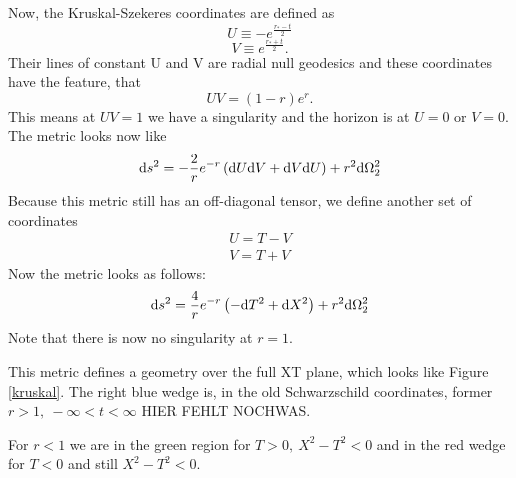 		Now, the Kruskal-Szekeres coordinates are defined as
		\begin{equation}
			U\equiv -e^{\frac{r_*-t}{2}}
		\end{equation}
		\begin{equation}
			V\equiv e^{\frac{r_*+t}{2}}.
		\end{equation}
	Their lines of constant U and V are radial null geodesics and these coordinates have the feature, that
		\begin{equation}
			 UV=(1-r)e^r.
		\end{equation}
	This means at $UV=1$ we have a singularity and the horizon is at $U=0$ or $V=0$. The metric looks now like
		\begin{equation}
			\mathrm{d} s^2=-\frac{2}{r}e^{-r}\left(\mathrm{d} U \mathrm{d} V + \mathrm{d} V \mathrm{d} U\right)+r^2 \mathrm{d} \Omega^2_{2}
		\end{equation}
	Because this metric still has an off-diagonal tensor, we define another set of coordinates
		\begin{equation}
		\begin{split}
			U=T-V 	\\	
			V=T+V
		\end{split}
		\end{equation}
	Now the metric looks as follows:
		\begin{equation}\label{SchXT}
			\mathrm{d} s^2=\frac{4}{r}e^{-r}\left(- \mathrm{d} T^2+ \mathrm{d} X^2\right)+r^2 \mathrm{d} \Omega^2_2
		\end{equation}
	Note that there is now no singularity at $r=1$. 
	
	This metric defines a geometry over the full XT plane, which looks like Figure \ref{kruskal}. The right blue wedge is, in the old Schwarzschild coordinates, former $r>1,~-\infty<t<\infty$ HIER FEHLT NOCHWAS. 
		
		For $r<1$ we are in the green region for $T>0,~X^2-T^2<0$ and in the red wedge for $T<0$ and still $X^2-T^2<0$. 

